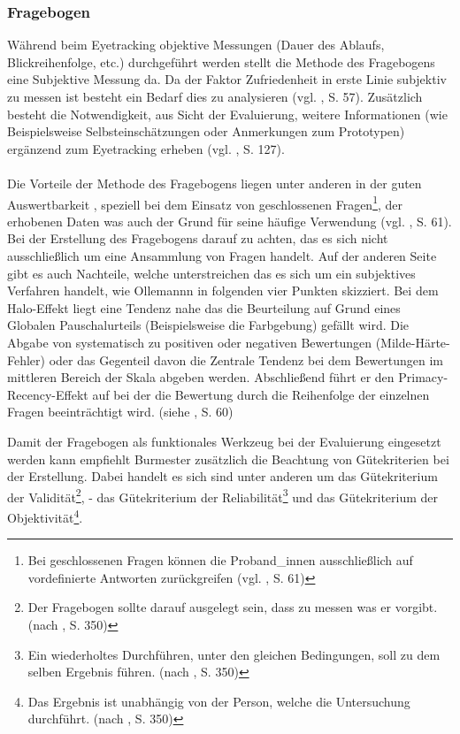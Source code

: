 \documentclass[Bachelorarbeit.tex]{subfiles}
\begin{document}
\subsubsection{Fragebogen}
\label{FragebogenEvaluation}


Während beim Eyetracking objektive Messungen  (Dauer des Ablaufs, Blickreihenfolge, etc.) durchgeführt werden stellt die Methode des Fragebogens eine Subjektive Messung da.
Da der Faktor Zufriedenheit in erste Linie subjektiv zu messen ist besteht ein Bedarf dies zu analysieren (vgl. \cite{Ollermann2007}, S. 57).
Zusätzlich besteht die Notwendigkeit, aus Sicht der Evaluierung, weitere Informationen (wie Beispielsweise Selbsteinschätzungen oder Anmerkungen zum Prototypen) ergänzend zum Eyetracking erheben (vgl. \cite{Laugwitz2006}, S. 127). \\
\\
Die Vorteile der Methode des Fragebogens liegen unter anderen in der guten Auswertbarkeit , speziell bei dem Einsatz von geschlossenen Fragen\footnote{Bei geschlossenen Fragen können die Proband\_innen ausschließlich auf vordefinierte Antworten zurückgreifen (vgl. \cite{Ollermann2007}, S. 61)}, der erhobenen Daten was auch der Grund für seine häufige Verwendung (vgl. \cite{Ollermann2007}, S. 61). 
Bei der Erstellung des Fragebogens darauf zu achten, das es sich nicht ausschließlich um eine Ansammlung von Fragen handelt.
Auf der anderen Seite gibt es auch Nachteile, welche unterstreichen das es sich um ein subjektives Verfahren handelt, wie Ollemannn in folgenden vier Punkten skizziert.
Bei dem Halo-Effekt liegt eine Tendenz nahe das die Beurteilung auf Grund eines Globalen Pauschalurteils (Beispielsweise die Farbgebung) gefällt wird.
Die Abgabe von systematisch zu positiven oder negativen Bewertungen (Milde-Härte-Fehler) oder das Gegenteil davon die Zentrale Tendenz bei dem Bewertungen im mittleren Bereich der Skala abgeben werden.
Abschließend führt er den Primacy-Recency-Effekt auf bei der die Bewertung durch die Reihenfolge der einzelnen Fragen beeinträchtigt wird. (siehe \cite{Ollermann2007}, S. 60)

Damit der Fragebogen als funktionales Werkzeug bei der Evaluierung eingesetzt werden kann empfiehlt Burmester zusätzlich die Beachtung von Gütekriterien bei der Erstellung. 
Dabei handelt es sich sind unter anderen um das Gütekriterium der Validität\footnote{Der Fragebogen sollte darauf ausgelegt sein, dass zu messen was er vorgibt. (nach \cite{Burmester}, S. 350)}, - das Gütekriterium der Reliabilität\footnote{Ein wiederholtes Durchführen, unter den gleichen Bedingungen, soll zu dem selben Ergebnis führen. (nach \cite{Burmester}, S. 350)} und das Gütekriterium der Objektivität\footnote{Das Ergebnis ist unabhängig von der Person, welche die Untersuchung durchführt. (nach \cite{Burmester}, S. 350)}. 
\end{document}
